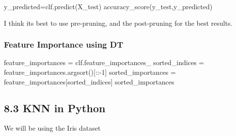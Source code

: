 \documentclass[
  letterpaper,
  DIV=11,
  numbers=noendperiod]{scrartcl}
\newenvironment{Shaded}{\begin{snugshade}}{\end{snugshade}}
\newcommand{\DecValTok}[1]{\textcolor[rgb]{0.68,0.00,0.00}{#1}}
\newcommand{\NormalTok}[1]{\textcolor[rgb]{0.00,0.23,0.31}{#1}}
\newcommand{\OperatorTok}[1]{\textcolor[rgb]{0.37,0.37,0.37}{#1}}
\begin{document}
\begin{Shaded}
\begin{Highlighting}[]
\NormalTok{y\_predicted}\OperatorTok{=}\NormalTok{clf.predict(X\_test)}
\NormalTok{accuracy\_score(y\_test,y\_predicted)}
\end{Highlighting}
\end{Shaded}

I think its best to use pre-pruning, and the post-pruning for the best
results.

\subsubsection{Feature Importance using
DT}\label{feature-importance-using-dt}

\begin{Shaded}
\begin{Highlighting}[]
\NormalTok{feature\_importances }\OperatorTok{=}\NormalTok{ clf.feature\_importances\_}
\NormalTok{sorted\_indices }\OperatorTok{=}\NormalTok{ feature\_importances.argsort()[::}\OperatorTok{{-}}\DecValTok{1}\NormalTok{]}
\NormalTok{sorted\_importances }\OperatorTok{=}\NormalTok{ feature\_importances[sorted\_indices]}
\NormalTok{sorted\_importances}
\end{Highlighting}
\end{Shaded}

\subsection{8.3 KNN in Python}\label{knn-in-python}

We will be using the Iris dataset
\end{document}
